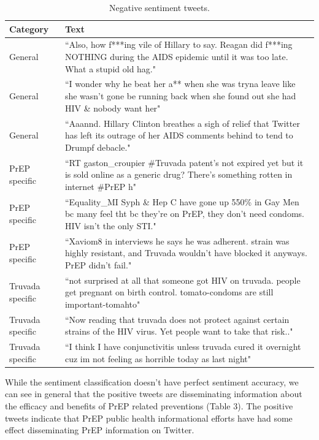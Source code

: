 \documentclass{sig-alternate-05-2015}
\begin{document}
\begin{table}
\centering
\caption{Negative sentiment tweets.}
\begin{tabular}{|p{2.5cm}|p{12cm}|} \hline
Category & Text\\ \hline
General & ``Also, how f***ing vile of Hillary to say. Reagan did f***ing NOTHING during the AIDS epidemic until it was too late. What a stupid old hag."\\ \hline
General & ``I wonder why he beat her a** when she was tryna leave like she wasn't gone be running back when she found out she had HIV \& nobody want her"\\ \hline
General & ``Aaannd. Hillary Clinton breathes a sigh of relief that Twitter has left its outrage of her AIDS comments behind to tend to Drumpf debacle."\\ \hline

PrEP specific & ``RT gaston\_croupier \#Truvada patent's not expired yet but it is sold online as a generic drug? There's something rotten in internet \#PrEP h"\\ \hline
PrEP specific & ``Equality\_MI Syph \& Hep C have gone up 550\% in Gay Men bc many feel tht bc they're on PrEP, they don't need condoms. HIV isn't the only STI."\\ \hline
PrEP specific & ``Xaviom8 in interviews he says he was adherent. strain was highly resistant, and Truvada wouldn't have blocked it anyways. PrEP didn't fail."\\ \hline

Truvada specific & ``not surprised at all that someone got HIV on truvada. people get pregnant on birth control. tomato-condoms are still important-tomahto"\\ \hline
Truvada specific & ``Now reading that truvada does not protect against certain strains of the HIV virus. Yet people want to take that risk.."\\ \hline
Truvada specific & ``I think I have conjunctivitis unless truvada cured it overnight cuz im not feeling as horrible today as last night"\\ \hline

\hline\end{tabular}
\end{table}

While the sentiment classification doesn't have perfect sentiment accuracy, we can see in general that the positive tweets are disseminating information about the efficacy and benefits of PrEP related preventions (Table 3). The positive tweets indicate that PrEP public health informational efforts have had some effect disseminating PrEP information on Twitter. 
\end{document}
